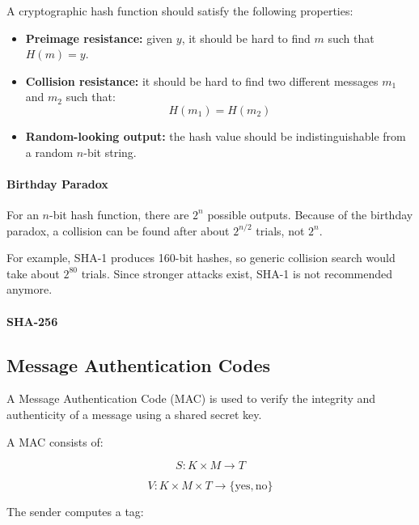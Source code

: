 A cryptographic hash function should satisfy the following properties:

\begin{itemize}
    \item \textbf{Preimage resistance:} given $y$, it should be hard to
    find $m$ such that $H(m)=y$.
    \item \textbf{Collision resistance:} it should be hard to find two
    different messages $m_1$ and $m_2$ such that:
    \[
    H(m_1)=H(m_2)
    \]
    \item \textbf{Random-looking output:} the hash value should be
    indistinguishable from a random $n$-bit string.
\end{itemize}

\paragraph{Birthday Paradox}

For an $n$-bit hash function, there are $2^n$ possible outputs. Because
of the birthday paradox, a collision can be found after about
$2^{n/2}$ trials, not $2^n$.

For example, SHA-1 produces 160-bit hashes, so generic collision search
would take about $2^{80}$ trials. Since stronger attacks exist, SHA-1 is
not recommended anymore.

\paragraph{SHA-256}


\subsection{Message Authentication Codes}

A Message Authentication Code (MAC) is used to verify the integrity and
authenticity of a message using a shared secret key.

A MAC consists of:

\[
S : K \times M \rightarrow T
\]

\[
V : K \times M \times T \rightarrow \{\text{yes},\text{no}\}
\]

The sender computes a tag:

